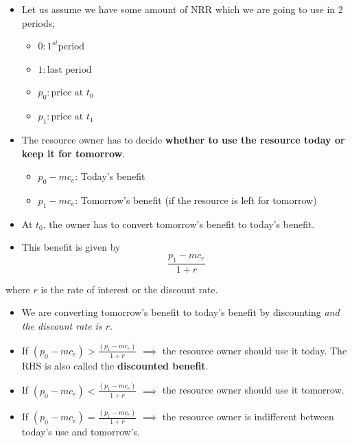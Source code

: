 \documentclass[
  ignorenonframetext,
]{beamer}
\providecommand{\tightlist}{%
  \setlength{\itemsep}{0pt}\setlength{\parskip}{0pt}}\usepackage{longtable,booktabs,array}
\begin{document}
\begin{frame}
\begin{itemize}
\tightlist
\item
  Let us assume we have some amount of NRR which we are going to use in
  2 periods;

  \begin{itemize}
  \tightlist
  \item
    \(0: 1^{st} \text{period}\)
  \item
    \(1: \text{last period}\)
  \item
    \(p_0: \text{price at } t_0\)
  \item
    \(p_1: \text{price at } t_1\)
  \end{itemize}
\item
  The resource owner has to decide \textbf{whether to use the resource
  today or keep it for tomorrow}.

  \begin{itemize}
  \tightlist
  \item
    \(p_0 - mc_e\): Today's benefit
  \item
    \(p_1 - mc_e\): Tomorrow's benefit (if the resource is left for
    tomorrow)
  \end{itemize}
\end{itemize}
\end{frame}

\begin{frame}
\begin{itemize}
\tightlist
\item
  At \(t_0\), the owner has to convert tomorrow's benefit to today's
  benefit.
\item
  This benefit is given by \[
  \frac{p_1 - mc_e}{1 + r}
  \]
\end{itemize}

where \(r\) is the rate of interest or the discount rate.
\end{frame}

\begin{frame}{}
\label{section}
\begin{itemize}
\tightlist
\item
  We are converting tomorrow's benefit to today's benefit by discounting
  \emph{and the discount rate is \(r\)}.
\item
  If \((p_0 - mc_e) > \frac{(p_1 - mc_e)}{1 + r}\) \(\implies\) the
  resource owner should use it today. The RHS is also called the
  \textbf{discounted benefit}.
\item
  If \((p_0 - mc_e) < \frac{(p_1 - mc_e)}{1 + r}\) \(\implies\) the
  resource owner should use it tomorrow.
\item
  If \((p_0 - mc_e) = \frac{(p_1 - mc_e)}{1 + r}\) \(\implies\) the
  resource owner is indifferent between today's use and tomorrow's.
\end{itemize}
\end{frame}
\end{document}
